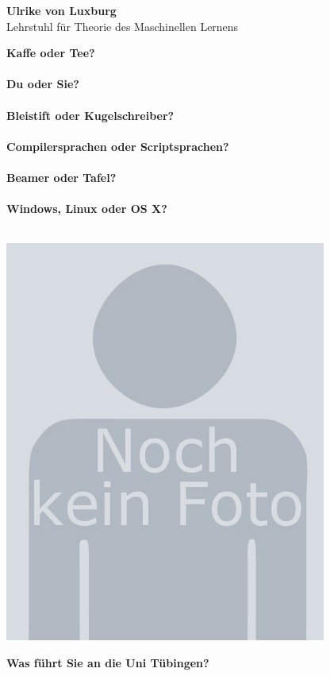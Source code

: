 \Large \textbf{Ulrike von Luxburg}\\
\large Lehrstuhl für Theorie des Maschinellen Lernens\\
\normalsize

\begin{minipage}[h]{0.65\textwidth}
	\textbf{Kaffe oder Tee?}\\
	\\
	\textbf{Du oder Sie?}\\
	\\
	\textbf{Bleistift oder Kugelschreiber?}\\
	\\
	\textbf{Compilersprachen oder Scriptsprachen?}\\
	\\
	\textbf{Beamer oder Tafel?}\\
	\\
	\textbf{Windows, Linux oder OS X?}\\
	\\
\end{minipage}
\begin{minipage}[h]{0.35\textwidth}
	\includegraphics[width=\textwidth]{content/pictures/no-image.jpeg}
\end{minipage}


\textbf{Was führt Sie an die Uni Tübingen?}